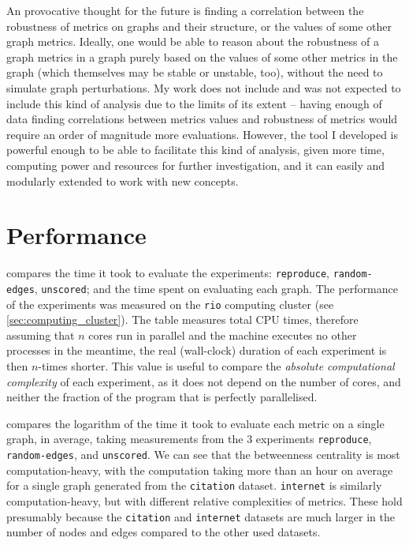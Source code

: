 An provocative thought for the future is finding a correlation between the robustness of metrics on graphs and their structure, or the values of some other graph metrics.
Ideally, one would be able to reason about the robustness of a graph metrics in a graph purely based on the values of some other metrics in the graph (which themselves may be stable or unstable, too), without the need to simulate graph perturbations.
My work does not include and was not expected to include this kind of analysis due to the limits of its extent -- having enough of data finding correlations between metrics values and robustness of metrics would require an order of magnitude more evaluations.
However, the \graffs tool I developed is powerful enough to be able to facilitate this kind of analysis, given more time, computing power and resources for further investigation, and it can easily and modularly extended to work with new concepts.

\section{Performance}



 compares the time it took to evaluate the experiments: \texttt{reproduce}, \texttt{random-edges}, \texttt{unscored}; and the time spent on evaluating each graph.
The performance of the experiments was measured on the \texttt{rio} computing cluster (see \autoref{sec:computing_cluster}).
The table measures total CPU times, therefore assuming that $n$ cores run in parallel and the machine executes no other processes in the meantime, the real (wall-clock) duration of each experiment is then $n$-times shorter.
This value is useful to compare the \textsl{absolute computational complexity} of each experiment, as it does not depend on the number of cores, and neither the fraction of the program that is perfectly parallelised.



 compares the logarithm of the time it took to evaluate each metric on a single graph, in average, taking measurements from the 3 experiments \texttt{reproduce}, \texttt{random-edges}, and \texttt{unscored}.
We can see that the betweenness centrality is most computation-heavy, with the computation taking more than an hour on average for a single graph generated from the \texttt{citation} dataset.
\texttt{internet} is similarly computation-heavy, but with different relative complexities of metrics.
These hold presumably because the \texttt{citation} and \texttt{internet} datasets are much larger in the number of nodes and edges compared to the other used datasets.



